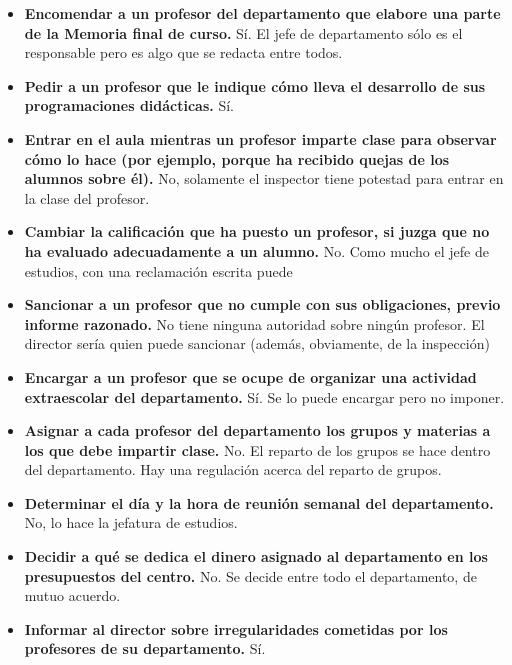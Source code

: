 \begin{itemize}

	\item \textbf{Encomendar a un profesor del departamento que elabore una parte de la Memoria final de curso.}
	Sí. El jefe de departamento sólo es el responsable pero es algo que se redacta entre todos.
	\item \textbf{Pedir a un profesor que le indique cómo lleva el desarrollo de sus programaciones didácticas.}
	Sí.
	\item \textbf{Entrar en el aula mientras un profesor imparte clase para observar cómo lo hace (por ejemplo, porque ha recibido quejas de los alumnos sobre él).}
	No, solamente el inspector tiene potestad para entrar en la clase del profesor.
	\item \textbf{Cambiar la calificación que ha puesto un profesor, si juzga que no ha evaluado adecuadamente a un alumno.}
	No. Como mucho el jefe de estudios, con una reclamación escrita puede
	\item \textbf{Sancionar a un profesor que no cumple con sus obligaciones, previo informe razonado.}
	No tiene ninguna autoridad sobre ningún profesor. 
	El director sería quien puede sancionar (además, obviamente, de la inspección)
	\item \textbf{Encargar a un profesor que se ocupe de organizar una actividad extraescolar del departamento.}
	Sí. Se lo puede encargar pero no imponer.
	\item \textbf{Asignar a cada profesor del departamento los grupos y materias a los que debe impartir clase.}
	No. El reparto de los grupos se hace dentro del departamento. Hay una regulación acerca del reparto de grupos.
	\item \textbf{Determinar el día y la hora de reunión semanal del departamento.}
	No, lo hace la jefatura de estudios. 
	\item \textbf{Decidir a qué se dedica el dinero asignado al departamento en los presupuestos del centro.}
	No. Se decide entre todo el departamento, de mutuo acuerdo.
	\item \textbf{Informar al director sobre irregularidades cometidas por los profesores de su departamento.}
	Sí.

\end{itemize}



